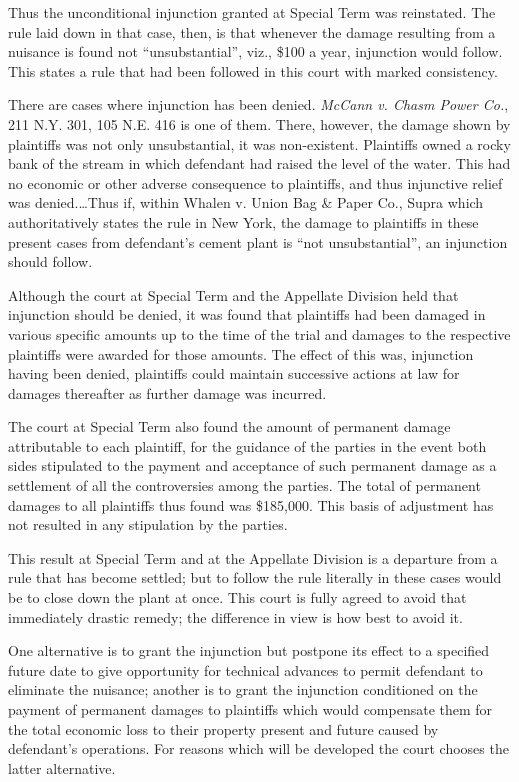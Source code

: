 Thus the unconditional injunction granted at Special Term was reinstated. The
rule laid down in that case, then, is that whenever the damage resulting from a
nuisance is found not ``unsubstantial'', viz., \$100 a year, injunction would
follow. This states a rule that had been followed in this court with marked
consistency.

There are cases where injunction has been denied. \emph{McCann v. Chasm Power
Co.}, 211 N.Y. 301, 105 N.E. 416 is one of them. There, however, the damage
shown by plaintiffs was not only unsubstantial, it was non-existent. Plaintiffs
owned a rocky bank of the stream in which defendant had raised the level of the
water. This had no economic or other adverse consequence to plaintiffs, and thus
injunctive relief was denied.\ldots Thus if, within Whalen v. Union Bag \& Paper
Co., Supra which authoritatively states the rule in New York, the damage to
plaintiffs in these present cases from defendant's cement plant is ``not
unsubstantial'', an injunction should follow.

Although the court at Special Term and the Appellate Division held that
injunction should be denied, it was found that plaintiffs had been damaged in
various specific amounts up to the time of the trial and damages to the
respective plaintiffs were awarded for those amounts. The effect of this was,
injunction having been denied, plaintiffs could maintain successive actions at
law for damages thereafter as further damage was incurred.

The court at Special Term also found the amount of permanent damage attributable
to each plaintiff, for the guidance of the parties in the event both sides
stipulated to the payment and acceptance of such permanent damage as a
settlement of all the controversies among the parties. The total of permanent
damages to all plaintiffs thus found was \$185,000. This basis of adjustment has
not resulted in any stipulation by the parties.

This result at Special Term and at the Appellate Division is a departure from a
rule that has become settled; but to follow the rule literally in these cases
would be to close down the plant at once. This court is fully agreed to avoid
that immediately drastic remedy; the difference in view is how best to avoid it.

One alternative is to grant the injunction but postpone its effect to a
specified future date to give opportunity for technical advances to permit
defendant to eliminate the nuisance; another is to grant the injunction
conditioned on the payment of permanent damages to plaintiffs which would
compensate them for the total economic loss to their property present and future
caused by defendant's operations. For reasons which will be developed the court
chooses the latter alternative.

